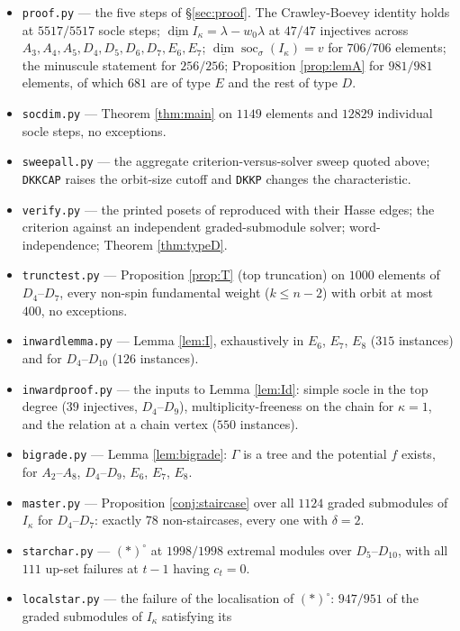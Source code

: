 \documentclass[11pt,reqno]{amsart}
\theoremstyle{plain}
\theoremstyle{definition}
\DeclareMathOperator{\soc}{soc}
\newcommand{\dimv}{\underline{\dim}}
\newcommand{\la}{\lambda}
\newcommand{\ka}{\kappa}
\begin{document}
\begin{itemize}
\item \texttt{proof.py} --- the five steps of \S\ref{sec:proof}.  The
Crawley-Boevey identity holds at $5517/5517$ socle steps; $\dimv
I_\ka=\la-w_0\la$ at $47/47$ injectives across
$A_3,A_4,A_5,D_4,D_5,D_6,D_7,E_6,E_7$;
$\dimv\soc_\sigma(I_\ka)=v$ for $706/706$ elements; the minuscule statement for
$256/256$; Proposition \ref{prop:lemA} for $981/981$ elements, of which $681$ are of type
$E$ and the rest of type $D$.
\item \texttt{socdim.py} --- Theorem \ref{thm:main} on $1149$ elements and
$12829$ individual socle steps, no exceptions.
\item \texttt{sweepall.py} --- the aggregate criterion-versus-solver sweep
quoted above; \texttt{DKKCAP} raises the orbit-size cutoff and \texttt{DKKP}
changes the characteristic.
\item \texttt{verify.py} --- the printed posets of \cite[pp.~82--83]{DKK}
reproduced with their Hasse edges; the criterion against an independent
graded-submodule solver; word-independence; Theorem \ref{thm:typeD}.
\item \texttt{trunctest.py} --- Proposition \ref{prop:T} (top truncation) on
$1000$ elements of $D_4$--$D_7$, every non-spin fundamental weight
($k\le n-2$) with orbit at most $400$, no exceptions.
\item \texttt{inwardlemma.py} --- Lemma \ref{lem:I}, exhaustively in $E_6$,
$E_7$, $E_8$ ($315$ instances) and for $D_4$--$D_{10}$ ($126$ instances).
\item \texttt{inwardproof.py} --- the inputs to Lemma \ref{lem:Id}: simple
socle in the top degree ($39$ injectives, $D_4$--$D_9$), multiplicity-freeness
on the chain for $\ka=1$, and the relation at a chain vertex ($550$ instances).
\item \texttt{bigrade.py} --- Lemma \ref{lem:bigrade}: $\Gamma$ is a tree and
the potential $f$ exists, for $A_2$--$A_8$, $D_4$--$D_9$, $E_6$, $E_7$, $E_8$.
\item \texttt{master.py} --- Proposition \ref{conj:staircase} over all $1124$
graded submodules of $I_\ka$ for $D_4$--$D_7$: exactly $78$ non-staircases,
every one with $\delta=2$.
\item \texttt{starchar.py} --- $(*)^{\circ}$ at $1998/1998$ extremal modules
over $D_5$--$D_{10}$, with all $111$ up-set failures at $t-1$ having $c_t=0$.
\item \texttt{localstar.py} --- the failure of the localisation of
$(*)^{\circ}$: $947/951$ of the graded submodules of $I_\ka$ satisfying its

\end{itemize}
\end{document}

